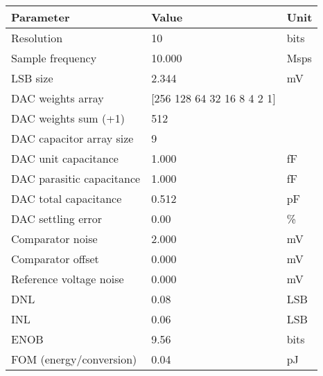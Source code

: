 \begin{tabular}{lll}
\toprule
Parameter & Value & Unit \\
\midrule
Resolution & 10 & bits \\
Sample frequency & 10.000 & Msps \\
LSB size & 2.344 & mV \\
DAC weights array & [256 128  64  32  16   8   4   2   1] &  \\
DAC weights sum (+1) & 512 &  \\
DAC capacitor array size & 9 &  \\
DAC unit capacitance & 1.000 & fF \\
DAC parasitic capacitance & 1.000 & fF \\
DAC total capacitance & 0.512 & pF \\
DAC settling error & 0.00 & \% \\
Comparator noise & 2.000 & mV \\
Comparator offset & 0.000 & mV \\
Reference voltage noise & 0.000 & mV \\
DNL & 0.08 & LSB \\
INL & 0.06 & LSB \\
ENOB & 9.56 & bits \\
FOM (energy/conversion) & 0.04 & pJ \\
\bottomrule
\end{tabular}
